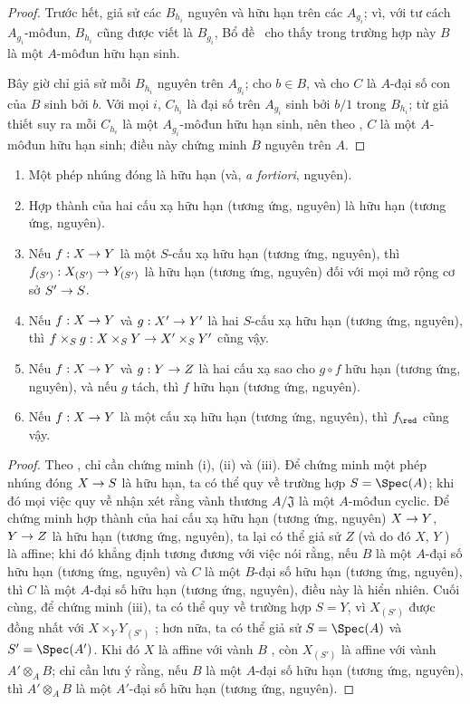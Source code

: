\documentclass[oneside,10pt]{amsart}
\makeatletter
\newcommand{\ega@arrow}[2]{\mathchoice{#1}{#2}{#2}{#2}}
\renewcommand{\to}{\ega@arrow{\longrightarrow}{\rightarrow}}
\newcommand{\oldpage}[2][]{\marginnote{\normalfont\footnotesize\textbf{#1}~|~#2}\ignorespaces}
\let\EGAOriginalLabel\label
\renewcommand{\label}[1]{\phantomsection\EGAOriginalLabel{#1}}
\makeatother
\begin{document}
\begin{proof}
Trước hết, giả sử các $B_{h_i}$ nguyên và hữu hạn trên các $A_{g_i}$;
vì, với tư cách $A_{g_i}$-môđun, $B_{h_i}$ cũng được viết là $B_{g_i}$, Bổ đề~ cho thấy trong trường hợp này $B$ là một $A$-môđun hữu hạn sinh.

Bây giờ chỉ giả sử mỗi $B_{h_i}$ nguyên trên $A_{g_i}$;
cho $b\in B$, và cho $C$ là $A$-đại số con của $B$ sinh bởi $b$.
Với mọi $i$, $C_{h_i}$ là đại số trên $A_{g_i}$ sinh bởi $b/1$ trong $B_{h_i}$;
từ giả thiết suy ra mỗi $C_{h_i}$ là một $A_{g_i}$-môđun hữu hạn sinh, nên theo , $C$ là một $A$-môđun hữu hạn sinh; điều này chứng minh $B$ nguyên trên $A$.
\end{proof}

\begin{proposition}[6.1.5]
\label{II.6.1.5}
\medskip\noindent
\begin{enumerate}
  \item[\rm{(i)}] Một phép nhúng đóng là hữu hạn (và, \emph{a fortiori}, nguyên).
  \item[\rm{(ii)}] Hợp thành của hai cấu xạ hữu hạn (tương ứng, nguyên) là hữu hạn (tương ứng, nguyên).
  \item[\rm{(iii)}] Nếu $f:X\to Y$ là một $S$-cấu xạ hữu hạn (tương ứng, nguyên), thì $f_{(S')}:X_{(S')}\to Y_{(S')}$ là hữu hạn (tương ứng, nguyên) đối với mọi mở rộng cơ sở $S'\to S$.
  \item[\rm{(iv)}] Nếu $f:X\to Y$ và $g:X'\to Y'$ là hai $S$-cấu xạ hữu hạn (tương ứng, nguyên), thì $f\times_S g:X\times_S Y\to X'\times_S Y'$ cũng vậy.
  \item[\rm{(v)}] Nếu $f:X\to Y$ và $g:Y\to Z$ là hai cấu xạ sao cho $g\circ f$ hữu hạn (tương ứng, nguyên), và nếu $g$ tách, thì $f$ hữu hạn (tương ứng, nguyên).
  \item[\rm{(vi)}] Nếu $f:X\to Y$ là một cấu xạ hữu hạn (tương ứng, nguyên), thì $f_\red$ cũng vậy.
\end{enumerate}
\end{proposition}
\oldpage[II]{112}
\begin{proof}
Theo , chỉ cần chứng minh (i), (ii) và (iii).
Để chứng minh một phép nhúng đóng $X\to S$ là hữu hạn, ta có thể quy về trường hợp $S=\Spec(A)$; khi đó mọi việc quy về nhận xét rằng vành thương $A/\mathfrak{J}$ là một $A$-môđun cyclic.
Để chứng minh hợp thành của hai cấu xạ hữu hạn (tương ứng, nguyên) $X\to Y$, $Y\to Z$ là hữu hạn (tương ứng, nguyên), ta lại có thể giả sử $Z$ (và do đó $X$, $Y$ ) là affine; khi đó khẳng định tương đương với việc nói rằng, nếu $B$ là một $A$-đại số hữu hạn (tương ứng, nguyên) và $C$ là một $B$-đại số hữu hạn (tương ứng, nguyên), thì $C$ là một $A$-đại số hữu hạn (tương ứng, nguyên), điều này là hiển nhiên.
Cuối cùng, để chứng minh (iii), ta có thể quy về trường hợp $S=Y$, vì $X_{(S')}$ được đồng nhất với $X\times_Y Y_{(S')}$ ;
hơn nữa, ta có thể giả sử $S=\Spec(A)$ và $S'=\Spec(A')$.
Khi đó $X$ là affine với vành $B$ , còn $X_{(S')}$ là affine với vành $A'\otimes_A B$;
chỉ cần lưu ý rằng, nếu $B$ là một $A$-đại số hữu hạn (tương ứng, nguyên), thì $A'\otimes_A B$ là một $A'$-đại số hữu hạn (tương ứng, nguyên).
\end{proof}
\end{document}
